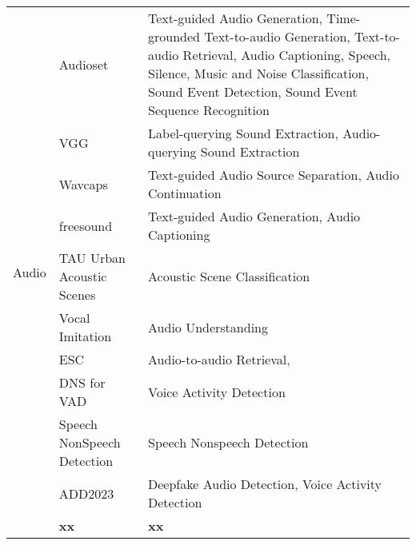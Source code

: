\begin{longtable}{p{2cm}p{6cm}p{6cm}}
    \midrule
    \multirow{11}{*}{Audio}  & Audioset \cite{45857}  & Text-guided Audio Generation, Time-grounded Text-to-audio Generation, Text-to-audio Retrieval, Audio Captioning, Speech, Silence, Music and Noise Classification, Sound Event Detection, Sound Event Sequence Recognition \\  %
                            & VGG \cite{chen2020vggsound}  & Label-querying Sound Extraction, Audio-querying Sound Extraction \\  %
                            & Wavcaps \cite{mei2023wavcaps}  & Text-guided Audio Source Separation, Audio Continuation\\  %
                            & freesound \cite{font2013freesound}  & Text-guided Audio Generation, Audio Captioning \\  %
                            & TAU Urban Acoustic Scenes \cite{heittola2020acoustic}  & Acoustic Scene Classification\\  %
                            & Vocal Imitation \cite{kim2018vocal}  & Audio Understanding \\  %
                            & ESC \cite{piczak2015dataset}  & Audio-to-audio Retrieval, \\  %
                            & DNS for VAD \cite{reddy2001interspeech}  & Voice Activity Detection \\  %
                            & Speech NonSpeech Detection \cite{mei2023wavcaps}  & Speech Nonspeech Detection \\  %
                            & ADD2023 \cite{yi2023add} &   Deepfake Audio Detection, Voice Activity Detection \\
                            
                            
                            
                            
    \midrule
     \textbf{Total}& \textbf{xx} &  \textbf{xx} \\
    \bottomrule
    
\end{longtable}
